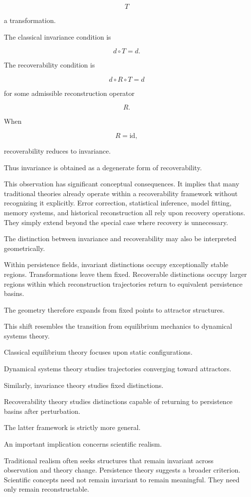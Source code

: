 \documentclass[12pt,oneside]{article}
\theoremstyle{definition}
\begin{document}
\[
T
\]

a transformation.

The classical invariance condition is

\[
d\circ T
=
d.
\]

The recoverability condition is

\[
d\circ R\circ T
=
d
\]

for some admissible reconstruction operator

\[
R.
\]

When

\[
R
=
\mathrm{id},
\]

recoverability reduces to invariance.

Thus invariance is obtained as a degenerate form of recoverability.

This observation has significant conceptual consequences. It implies that many traditional theories already operate within a recoverability framework without recognizing it explicitly. Error correction, statistical inference, model fitting, memory systems, and historical reconstruction all rely upon recovery operations. They simply extend beyond the special case where recovery is unnecessary.

The distinction between invariance and recoverability may also be interpreted geometrically.

Within persistence fields, invariant distinctions occupy exceptionally stable regions. Transformations leave them fixed. Recoverable distinctions occupy larger regions within which reconstruction trajectories return to equivalent persistence basins.

The geometry therefore expands from fixed points to attractor structures.

This shift resembles the transition from equilibrium mechanics to dynamical systems theory.

Classical equilibrium theory focuses upon static configurations.

Dynamical systems theory studies trajectories converging toward attractors.

Similarly, invariance theory studies fixed distinctions.

Recoverability theory studies distinctions capable of returning to persistence basins after perturbation.

The latter framework is strictly more general.

An important implication concerns scientific realism.

Traditional realism often seeks structures that remain invariant across observation and theory change. Persistence theory suggests a broader criterion. Scientific concepts need not remain invariant to remain meaningful. They need only remain reconstructable.
\end{document}
